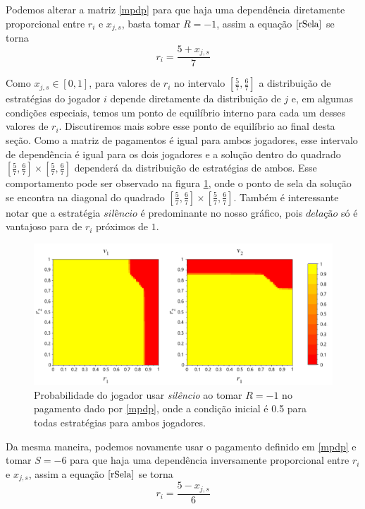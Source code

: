 Podemos alterar a matriz \ref{mpdp} para que haja uma dependência diretamente proporcional entre $r_i$ e $x_{j,s}$, basta tomar $R=-1$, assim a equação $\eqref{rSela}$ se torna
\begin{equation}
    r_i=\frac{5+x_{j,s}}{7}
\end{equation}

Como $x_{j,s}\in[0,1]$, para valores de $r_i$ no intervalo $[\frac{5}{7},\frac{6}{7}]$ a distribuição de estratégias do jogador $i$ depende diretamente da distribuição de $j$ e, em algumas condições especiais, temos um ponto de equilíbrio interno para cada um desses valores de $r_i$. Discutiremos mais sobre esse ponto de equilíbrio ao final desta seção. Como a matriz de pagamentos é igual para ambos jogadores, esse intervalo de dependência é igual para os dois jogadores e a solução dentro do quadrado $[\frac{5}{7},\frac{6}{7}]\times[\frac{5}{7},\frac{6}{7}]$ dependerá da distribuição de estratégias de ambos. Esse comportamento pode ser observado na figura \ref{fig:pd-neg-payoff-dependant}, onde o ponto de sela da solução se encontra na diagonal do quadrado $[\frac{5}{7},\frac{6}{7}]\times[\frac{5}{7},\frac{6}{7}]$. Também é interessante notar que a estratégia $\textit{silêncio}$ é predominante no nosso gráfico, pois $\textit{delação}$ só é vantajoso para de $r_i$ próximos de $1$.

\begin{figure}[h]
    \caption{Probabilidade do jogador usar \textit{silêncio} ao tomar $R=-1$ no pagamento dado por \ref{mpdp}, onde a condição inicial é 0.5 para todas estratégias para ambos jogadores.}
    \centerline{\includegraphics[scale=0.43]{./img/PD-neg-payoff-dependant.png}}
    \label{fig:pd-neg-payoff-dependant}
\end{figure}

Da mesma maneira, podemos novamente usar o pagamento definido em \ref{mpdp} e tomar $S=-6$ para que haja uma dependência inversamente proporcional entre $r_i$ e $x_{j,s}$, assim a equação $\eqref{rSela}$ se torna
\begin{equation}
    \label{eqQuadradoEx}
    r_i=\frac{5-x_{j,s}}{6}
\end{equation}

